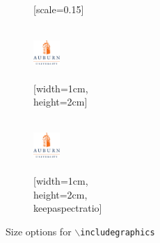 \documentclass[article]{beamer}
\begin{document}
\begin{frame}
\begin{figure}[]
\begin{subfigure}[b]{0.3\linewidth}
      \caption{[scale=0.15]}
    \end{subfigure}
    \hfill
    \begin{subfigure}[b]{0.3\linewidth}
      \centering
      \includegraphics[width=1cm,height=2cm]{aulogo.pdf}
      \caption{[width=1cm,\\height=2cm]}
    \end{subfigure}
    \begin{subfigure}[b]{0.3\linewidth}
      \centering
      \includegraphics[width=1cm,height=2cm,keepaspectratio]{aulogo.pdf}
      \caption{[width=1cm,\\height=2cm,\\keepaspectratio]}
    \end{subfigure}
    \caption{Size options for \texttt{$\backslash$includegraphics}}
  \end{figure}
\end{frame}
\end{document}

